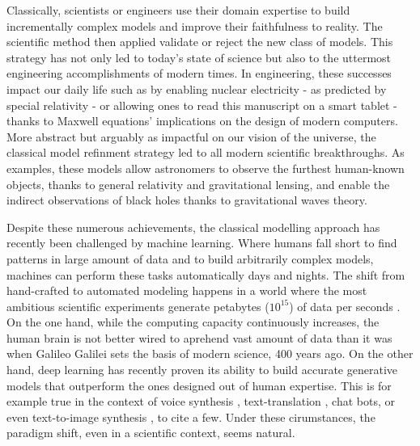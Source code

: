 Classically, scientists or engineers use their domain expertise to build incrementally complex models and improve their faithfulness to reality. The scientific method then applied validate or reject the new class of models.
This strategy has not only led to today's state of science but also to the uttermost engineering accomplishments of modern times.
In engineering, these successes impact our daily life such as by enabling nuclear electricity - as predicted by special relativity - or
allowing ones to read this manuscript on a smart tablet - thanks to Maxwell equations' implications on the design of modern computers.
More abstract but arguably as impactful on our vision of the universe, the classical model refinment strategy led to all modern scientific breakthroughs. As examples, these models allow astronomers to observe the furthest human-known objects, thanks to general relativity and gravitational lensing, and enable the indirect observations of black holes thanks to gravitational waves theory.


Despite these numerous achievements, the classical modelling approach has recently been challenged by machine learning. Where humans fall short to find patterns in large amount of data and to build arbitrarily complex models, machines can perform these tasks automatically days and nights.
The shift from hand-crafted to automated modeling happens in a world where the most ambitious scientific experiments generate petabytes ($10^{15}$) of data per seconds \citep{noauthor_cern_nodate}. On the one hand, while the computing capacity continuously increases, the human brain is not better wired to aprehend vast amount of data than it was when Galileo Galilei sets the basis of modern science, 400 years ago. On the other hand, deep learning has recently proven its ability to build accurate generative models that outperform the ones designed out of human expertise. This is for example true in the context of voice synthesis \citep{van_den_oord_wavenet_2016}, text-translation \citep{GPT3, bert...}, chat bots, or even text-to-image synthesis \citep{Dall-e-2, imagen}, to cite a few. Under these cirumstances, the paradigm shift, even in a scientific context, seems natural.

